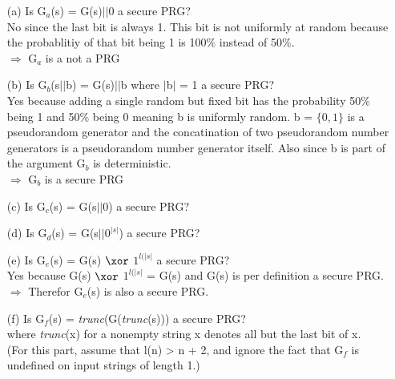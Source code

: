 
\begin{itemize}
\item[(a)]
	Is G\(_{a}\)(s) = G(s)\(\vert \vert\)0 a secure PRG? \\
	No since the last bit is always 1. This bit is not uniformly at random because the probablitiy of that bit being 1 is 100\(\%\) instead of 50\(\%\). \\
	\(\Rightarrow\)  G\(_{a}\) is a not a PRG
\item[(b)]
	Is G\(_{b}\)(s\(\vert \vert\)b) = G(s)\(\vert \vert\)b where \(\vert\)b\(\vert\) = 1 a secure PRG? \\
	Yes because adding a single random but fixed bit has the probability 50\(\%\) being 1 and  50\(\%\) being 0 meaning b is uniformly random.
	b = \(\{0,1\}\) is a pseudorandom generator and the concatination of two pseudorandom number generators is a pseudorandom number generator itself.
	Also since b is part of the argument G\(_{b}\) is deterministic. \\
	\(\Rightarrow\)  G\(_{b}\) is a secure PRG
\item[(c)]
	Is G\(_{c}\)(s) = G(s\(\vert \vert\)0) a secure PRG? \\
	
\item[(d)]
	Is G\(_{d}\)(s) = G(s\(\vert \vert\)\(0^{\vert s \vert}\)) a secure PRG? \\

\item[(e)]
	Is G\(_{e}\)(s) = G(s) \(\xor\) \(1^{ l(\vert s \vert}\) a secure PRG? \\
	Yes because G(s)  \(\xor\) \(1^{ l(\vert s \vert}\) = G(s) and G(s) is per definition a secure PRG. \\
	\(\Rightarrow\) Therefor G\(_{e}\)(s) is also a secure PRG.
\item[(f)]
	Is G\(_{f}\)(s) = \textit{trunc}(G(\textit{trunc}(s))) a secure PRG? \\
	where \textit{trunc}(x) for a nonempty string x denotes all but the last bit of x. \\
	(For this part, assume that l(n) >  n + 2, and ignore the fact that G\(_{f}\) is undefined on input strings of length 1.) \\
	\\
	
\end{itemize}
